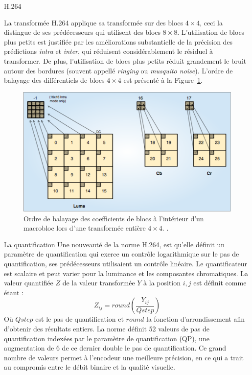 \documentclass{article}
\begin{document}
\begin{section}{H.264}
\begin{subsection}{La transformée}
H.264 applique sa transformée sur des blocs $4 \times 4$, ceci la distingue de
ses prédécesseurs qui utilisent des blocs $8 \times 8$. L'utilisation de blocs
plus petits est justifiée par les améliorations substantielle de la  précision
des prédictions \textit{intra} et \textit{inter}, qui réduisent considérablement
le résiduel à transformer. De plus, l'utilisation de blocs plus petits réduit grandement
le bruit autour des bordures (souvent appellé \textit{ringing} ou
\textit{musquito noise}). L'ordre de balayage des différentiels de blocs $4
\times 4$ est présenté à la Figure~\ref{fig-Transform}.

\begin{figure}[htb]
\centering
\includegraphics[width=\linewidth]{images/Transform.png}
\caption{Ordre de balayage des coefficients de blocs à
l'intérieur d'un macrobloc lors d'une transformée entière $4 \times 4$. \cite{richardson2003}.}
\label{fig-Transform}
\end{figure}

\end{subsection}

\begin{subsection}{La quantification}
Une nouveauté de la norme H.264, est qu'elle définit un paramètre de
quantification qui exerce un contrôle logarithmique sur le pas de
quantification, ses prédécesseurs utilisaient un contrôle linéaire. Le
quantificateur est scalaire et peut varier pour la luminance et les composantes
chromatiques. La valeur quantifiée $Z$ de la valeur transformée $Y$ à la
position $i,j$ est définit comme étant :
\begin{equation}
Z_{ij} = round\left(\frac{Y_{ij}}{Qstep}\right)
\end{equation}
Où $Qstep$ est le pas de quantification et $round$ la fonction d'arrondissement
afin d'obtenir des résultats entiers. La norme définit 52 valeurs de pas de
quantification indexées par le paramètre de quantification (QP), une
augmentation de 6 de ce dernier double le pas de quantification. Ce grand nombre
de valeurs permet à l'encodeur une meilleure précision, en ce qui a trait au
compromis entre le débit binaire et la qualité visuelle.
\end{subsection}


\end{section}
\end{document}
